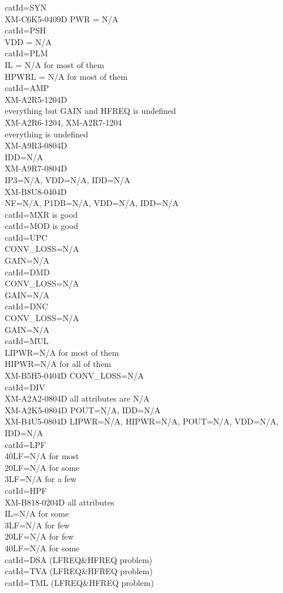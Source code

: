 \documentclass[11pt]{article}
\begin{document}
catId=SYN\\
  XM-C6K5-0409D PWR = N/A\\
catId=PSH\\
  VDD = N/A\\
catId=PLM\\
  IL = N/A for most of them\\
  HPWRL = N/A for most of them\\
catId=AMP\\
  XM-A2R5-1204D\\
    everything but GAIN and HFREQ is undefined\\
  XM-A2R6-1204, XM-A2R7-1204\\
    everything is undefined\\
  XM-A9R3-0804D\\
    IDD=N/A\\
  XM-A9R7-0804D\\
    IP3=N/A, VDD=N/A, IDD=N/A\\
  XM-B8U8-0404D\\
    NF=N/A, P1DB=N/A, VDD=N/A, IDD=N/A\\
catId=MXR is good\\
catId=MOD is good\\
catId=UPC\\
  CONV\_LOSS=N/A\\
  GAIN=N/A\\
catId=DMD\\
  CONV\_LOSS=N/A\\
  GAIN=N/A\\
catId=DNC\\
  CONV\_LOSS=N/A\\
  GAIN=N/A\\
catId=MUL\\
  LIPWR=N/A for most of them\\
  HIPWR=N/A for all of them\\
  XM-B5H5-0404D CONV\_LOSS=N/A\\
catId=DIV\\
  XM-A2A2-0804D all attributes are N/A\\
  XM-A2K5-0804D POUT=N/A, IDD=N/A\\
  XM-B4U5-0804D LIPWR=N/A, HIPWR=N/A, POUT=N/A, VDD=N/A, IDD=N/A\\
catId=LPF\\
  40LF=N/A for most\\
  20LF=N/A for some\\
  3LF=N/A for a few\\
catId=HPF\\
  XM-B818-0204D all attributes\\
  IL=N/A for some\\
  3LF=N/A for few\\
  20LF=N/A for few\\
  40LF=N/A for some\\
catId=DSA (LFREQ\&HFREQ problem)\\
catId=TVA (LFREQ\&HFREQ problem)\\
catId=TML (LFREQ\&HFREQ problem)\\
\end{document}
